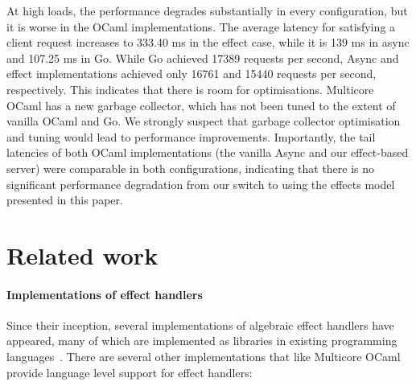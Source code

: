 \documentclass{llncs}
\begin{document}
At high loads, the performance degrades substantially in every
configuration, but it is worse in the OCaml implementations. The
average latency for satisfying a client request increases to 333.40 ms
in the effect case, while it is 139 ms in async and 107.25 ms in
Go. While Go achieved 17389 requests per second, Async and effect
implementations achieved only 16761 and 15440 requests per second,
respectively. This indicates that there is room for
optimisations. Multicore OCaml has a new garbage collector, which has
not been tuned to the extent of vanilla OCaml and Go. We strongly
suspect that garbage collector optimisation and tuning would lead to
performance improvements. Importantly, the tail latencies of both OCaml implementations (the
vanilla Async and our effect-based server) were comparable in both
configurations, indicating that there is no significant performance
degradation from our switch to using the effects model presented
in this paper.

\section{Related work}
\label{sec:related_work}

\paragraph{Implementations of effect handlers}
Since their inception, several implementations of algebraic effect
handlers have appeared, many of which are implemented as libraries in
existing programming
languages~\citep*{Brady13,KammarLO13,KiselyovI15,KiselyovSS13,KiselyovS16,SalehS16,WuSH14}. There
are several other implementations that like Multicore OCaml provide
language level support for effect handlers:
\end{document}

